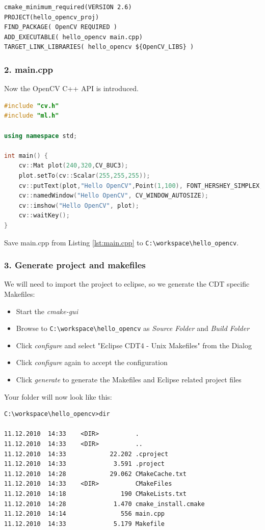 \begin{lstlisting}[caption=CMakeLists.txt, label=lst:cmakelists.txt]
cmake_minimum_required(VERSION 2.6)
PROJECT(hello_opencv_proj)
FIND_PACKAGE( OpenCV REQUIRED )
ADD_EXECUTABLE( hello_opencv main.cpp)
TARGET_LINK_LIBRARIES( hello_opencv ${OpenCV_LIBS} )
\end{lstlisting}

\subsubsection*{2. main.cpp}
Now the OpenCV C++ API is introduced.

\begin{lstlisting}[language=C++, label=lst:main.cpp]
#include "cv.h"
#include "ml.h"

using namespace std;

int main() {
	cv::Mat plot(240,320,CV_8UC3);
	plot.setTo(cv::Scalar(255,255,255));
	cv::putText(plot,"Hello OpenCV",Point(1,100), FONT_HERSHEY_SIMPLEX, 1.0 ,Scalar(0,0,0), 1, 8, false);
	cv::namedWindow("Hello OpenCV", CV_WINDOW_AUTOSIZE);
	cv::imshow("Hello OpenCV", plot);
	cv::waitKey();
}
\end{lstlisting}

Save main.cpp from Listing \ref{lst:main.cpp} to \verb|C:\workspace\hello_opencv|.

\subsubsection*{3. Generate project and makefiles}
We will need to import the project to eclipse, so we generate the CDT specific Makefiles:

\begin{itemize}
\item Start the \textit{cmake-gui}
\item Browse to \verb|C:\workspace\hello_opencv| as \textit{Source Folder} and \textit{Build Folder}
\item Click \textit{configure} and select "Eclipse CDT4 - Unix Makefiles" from the Dialog
\item Click \textit{configure} again to accept the configuration
\item Click \textit{generate} to generate the Makefiles and Eclipse related project files
\end{itemize}

Your folder will now look like this:

\begin{lstlisting}
C:\workspace\hello_opencv>dir

11.12.2010  14:33    <DIR>          .
11.12.2010  14:33    <DIR>          ..
11.12.2010  14:33            22.202 .cproject
11.12.2010  14:33             3.591 .project
11.12.2010  14:28            29.062 CMakeCache.txt
11.12.2010  14:33    <DIR>          CMakeFiles
11.12.2010  14:18               190 CMakeLists.txt
11.12.2010  14:28             1.470 cmake_install.cmake
11.12.2010  14:14               556 main.cpp
11.12.2010  14:33             5.179 Makefile
\end{lstlisting}

